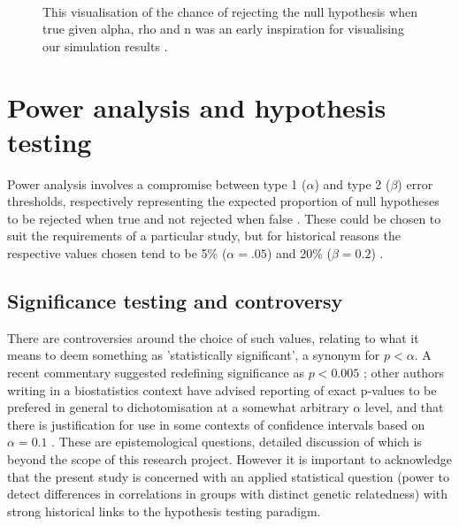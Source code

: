 \\

\begin{figure}[htbp]
\sidecaption[t]
{}
\caption{This visualisation of the chance of rejecting the null hypothesis when true given alpha, rho and n was an early inspiration for visualising our simulation results \cite{David1938}.}
\label{fig:davidplot}       %
\end{figure}

\section{Power analysis and hypothesis testing} 
Power analysis involves a compromise between type 1 ($\alpha$) and type 2 ($\beta$) error thresholds, respectively representing the expected proportion of null hypotheses to be rejected when true and not rejected when false  \cite{Freiman1978}.  These could be chosen to suit the requirements of a particular study, but for historical reasons the respective values chosen tend to be 5\% ($\alpha = .05$) and 20\% ($\beta = 0.2$) \cite{Cohen1988}.  

\subsection{Significance testing and controversy}
There are controversies around the choice of such values, relating to what it means to deem something as 'statistically significant', a synonym for $p < \alpha$. A recent commentary suggested redefining significance as $p < 0.005$ \cite{Benjamin2018}; other authors writing in a biostatistics context have advised reporting of exact p-values to be prefered in general to dichotomisation at a somewhat arbitrary $\alpha$ level, and that there is justification for use in some contexts of confidence intervals based on $\alpha=0.1$ \cite{Clayton1993}.  These are epistemological questions, detailed discussion of which is beyond the scope of this research project.  However it is important to acknowledge that the present study is concerned with an applied statistical question (power to detect differences in correlations in groups with distinct genetic relatedness) with strong historical links to the hypothesis testing paradigm.  

